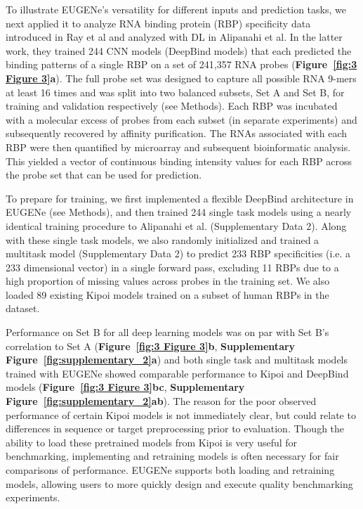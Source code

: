 To illustrate EUGENe’s versatility for different inputs and prediction tasks, we next applied it to analyze RNA binding protein (RBP) specificity data introduced in Ray et al\cite{Ray2013-yd} and analyzed with DL in Alipanahi et al\cite{Alipanahi2015-ef}. In the latter work, they trained 244 CNN models (DeepBind models) that each predicted the binding patterns of a single RBP on a set of 241,357 RNA probes (\textbf{Figure~\ref{fig:3 Figure 3}a}). The full probe set was designed to capture all possible RNA 9-mers at least 16 times and was split into two balanced subsets, Set A and Set B, for training and validation respectively (see Methods)\cite{Ray2013-yd}. Each RBP was incubated with a molecular excess of probes from each subset (in separate experiments) and subsequently recovered by affinity purification. The RNAs associated with each RBP were then quantified by microarray and subsequent bioinformatic analysis\cite{Berger2009-la}. This yielded a vector of continuous binding intensity values for each RBP across the probe set that can be used for prediction.

To prepare for training, we first implemented a flexible DeepBind architecture in EUGENe (see Methods), and then trained 244 single task models using a nearly identical training procedure to Alipanahi et al. (Supplementary Data 2). Along with these single task models, we also randomly initialized and trained a multitask model (Supplementary Data 2) to predict 233 RBP specificities (i.e. a 233 dimensional vector) in a single forward pass, excluding 11 RBPs due to a high proportion of missing values across probes in the training set. We also loaded 89 existing Kipoi\cite{Avsec2019-ke} models trained on a subset of human RBPs in the dataset.

Performance on Set B for all deep learning models was on par with Set B’s correlation to Set A (\textbf{Figure~\ref{fig:3 Figure 3}b}, \textbf{Supplementary Figure~\ref{fig:supplementary_2}a}) and both single task and multitask models trained with EUGENe showed comparable performance to Kipoi and DeepBind models (\textbf{Figure~\ref{fig:3 Figure 3}b}\textbf{c}, \textbf{Supplementary Figure~\ref{fig:supplementary_2}a}\textbf{b}). The reason for the poor observed performance of certain Kipoi models is not immediately clear, but could relate to differences in sequence or target preprocessing prior to evaluation. Though the ability to load these pretrained models from Kipoi is very useful for benchmarking, implementing and retraining models is often necessary for fair comparisons of performance. EUGENe supports both loading and retraining models, allowing users to more quickly design and execute quality benchmarking experiments. 

